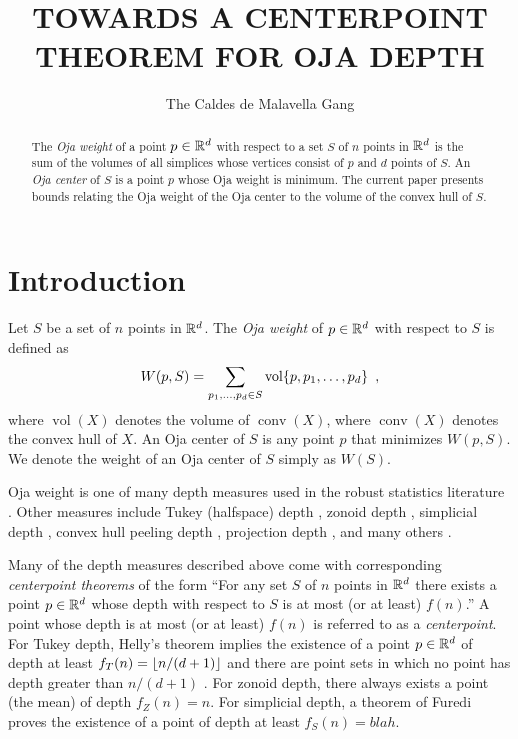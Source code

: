 \documentclass[lotsofwhite]{patmorin}
\title{\MakeUppercase{Towards a Centerpoint Theorem for Oja Depth}}
\author{The Caldes de Malavella Gang}
\date{}
\newcommand{\oja}{W}
\DeclareMathOperator{\vol}{vol}
\DeclareMathOperator{\conv}{conv}
\begin{document}
\maketitle

\begin{abstract}
The \emph{Oja weight} of a point $p\in\mathbb{R}^d$ with respect to a set $S$
of $n$ points in $\mathbb{R}^d$ is the sum of the volumes of all simplices
whose vertices consist of $p$ and $d$ points of $S$.  An \emph{Oja
center} of $S$ is a point $p$ whose Oja weight is minimum.
The current paper presents bounds relating the Oja weight of the Oja 
center to the volume of the convex hull of $S$.
\end{abstract}


\section{Introduction}

Let $S$ be a set of $n$ points in $\mathbb{R}^d$.  The \emph{Oja weight} of
$p\in\mathbb{R}^d$ with respect to $S$ is defined as
\begin{equation}
     \oja(p,S) = \sum_{p_1,\ldots,p_d\in S}\vol\{p,p_1,\ldots,p_d\}
      \enspace , \eqnlabel{oja}
\end{equation}
where $\vol(X)$ denotes the volume of $\conv(X)$, where $\conv(X)$
denotes the convex hull of
$X$.  An Oja center of $S$ is any
point $p$ that minimizes $W(p,S)$.  We denote the weight of an Oja
center of $S$ simply as $W(S)$.

Oja weight is one of many depth measures used in the robust statistics
literature \cite{X,X,X,X}.  Other measures include Tukey (halfspace)
depth \cite{X}, zonoid depth \cite{X}, simplicial depth \cite{X},
convex hull peeling depth \cite{X}, projection depth \cite{X}, and
many others \cite{X}.

Many of the depth measures described above come with corresponding
\emph{centerpoint theorems} of the form ``For any set $S$ of $n$ points
in $\mathbb{R}^d$ there exists a point $p\in\mathbb{R}^d$ whose depth with respect to $S$ is
at most (or at least) $f(n)$.''  A point whose depth is at most (or at
least) $f(n)$ is referred to as a \emph{centerpoint}.  For Tukey
depth, Helly's theorem implies the existence of a point $p\in\mathbb{R}^d$ of
depth at least $f_T(n)=\left\lfloor n/(d+1) \right\rfloor$ and there are point sets in
which no point has depth greater than $n/(d+1)$ \cite{X}.  For zonoid
depth, there always exists a point (the mean) of depth $f_Z(n)=n$.
For simplicial depth, a theorem of Furedi \cite{fXX} proves the
existence of a point of depth at least $f_S(n)=blah$.
\end{document}
